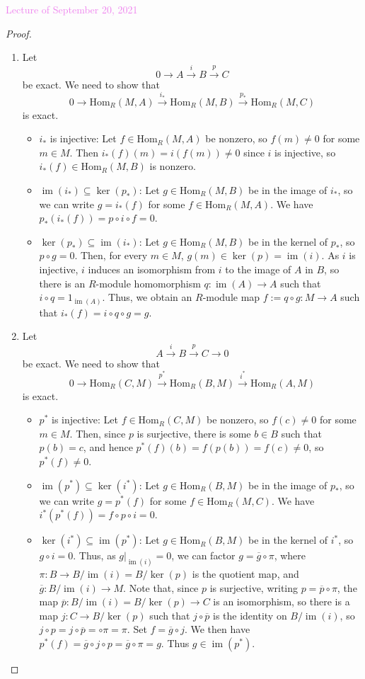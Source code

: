\documentclass{amsart}[12pt]
\def\image{\operatorname{im}}
\def\im{\image}
\def\ker{\operatorname{ker}}
\newcommand{\Hom}{\mathrm{Hom}}
\newcommand{\Sept}[1]{\textcolor{violet}{Lecture of September #1, 2021}}
\numberwithin{equation}{section}
\theoremstyle{plain} %
\theoremstyle{definition}
\theoremstyle{remark}
\newcommand{\xra}[1]{\xrightarrow{#1}}
\begin{document}
\Sept{20}
\begin{proof} 
\begin{enumerate}
\item Let \[ 0 \to A \xra{i} B \xra{p} C\]
be  exact. We need to show that
\[ 0 \to \Hom_R(M,A) \xra{i_*} \Hom_R(M,B) \xra{p_*} \Hom_R(M,C)\]
is exact.
\begin{itemize}
\item $i_*$ is injective: Let $f\in \Hom_R(M,A)$ be nonzero, so $f(m)\neq 0$ for some $m\in M$. Then $i_*(f)(m) = i(f(m))\neq 0$ since $i$ is injective, so $i_*(f)\in \Hom_R(M,B)$ is nonzero.
\item $\im(i_*)\subseteq \ker(p_*)$: Let $g\in \Hom_R(M,B)$ be in the image of $i_*$, so we can write $g=i_*(f)$ for some $f\in \Hom_R(M,A)$. We have $p_*(i_*(f))=p\circ i \circ f=0$.
\item $\ker(p_*)\subseteq\im(i_*)$: Let $g\in \Hom_R(M,B)$ be in the kernel of $p_*$, so $p\circ g=0$. Then, for every $m\in M$, $g(m)\in \ker(p) = \im(i)$. As $i$ is injective, $i$ induces an isomorphism from $i$ to the image of $A$ in $B$, so there is an $R$-module homomorphism $q:\im(A) \to A$ such that $i \circ q=1_{\im(A)}$. Thus, we obtain an $R$-module map $f:= q\circ g :M\to A$ such that $i_*(f) = i \circ q \circ g = g$.
\end{itemize}
\item Let \[ A \xra{i} B \xra{p} C \to 0\]
be  exact. We need to show that
\[ 0 \to \Hom_R(C,M)\xra{p^*}  \Hom_R(B,M) \xra{i^*} \Hom_R(A,M)  \]
is exact.
\begin{itemize}
\item $p^*$ is injective: Let $f\in \Hom_R(C,M)$ be nonzero, so $f(c)\neq 0$ for some $m\in M$. Then, since $p$ is surjective, there is some $b\in B$ such that $p(b)=c$, and hence $p^*(f)(b)=f(p(b))=f(c)\neq 0$, so $p^*(f)\neq 0$.

\item $\im(p^*)\subseteq \ker(i^*)$: Let $g\in \Hom_R(B,M)$ be in the image of $p_*$, so we can write $g=p^*(f)$ for some $f\in \Hom_R(M,C)$. We have $i^*(p^*(f))=f \circ p \circ i=0$.

\item $\ker(i^*)\subseteq\im(p^*)$: Let $g\in \Hom_R(B,M)$ be in the kernel of $i^*$, so $g\circ i=0$. Thus, as $g|_{\im(i)} = 0$, we can factor $g=\overline{g} \circ \pi$, where $\pi:B\to B/\im(i)=B/\ker(p)$ is the quotient map, and $\overline{g}:B/\im(i) \to M$. Note that, since $p$ is surjective, writing $p=\overline{p} \circ \pi$, the map $\overline{p}:B/\im(i) = B/\ker(p) \to C$ is an isomorphism, so there is a map $j:C\to B/\ker(p)$ such that $ j \circ \overline{p}$ is the identity on $B/\im(i)$, so $j\circ p = j\circ \overline{p} = \circ \pi = \pi$. Set $f=\overline{g} \circ j$. We then have $p^*(f)= \overline{g} \circ j \circ p = \overline{g} \circ \pi=g$. Thus $g\in \im(p^*)$.\qedhere\end{itemize}
\end{enumerate}
\end{proof}
\end{document}
